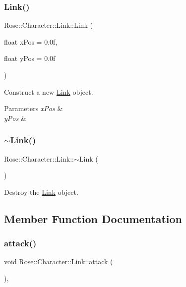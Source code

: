 \subsubsection{\texorpdfstring{Link()}{Link()}}
{\footnotesize\ttfamily Rose\+::\+Character\+::\+Link\+::\+Link (\begin{DoxyParamCaption}\item[{float}]{x\+Pos = {\ttfamily 0.0f},  }\item[{float}]{y\+Pos = {\ttfamily 0.0f} }\end{DoxyParamCaption})}



Construct a new \mbox{\hyperlink{classRose_1_1Character_1_1Link}{Link}} object. 


\begin{DoxyParams}{Parameters}
{\em x\+Pos} & \\
\hline
{\em y\+Pos} & \\
\hline
\end{DoxyParams}
\mbox{\label{classRose_1_1Character_1_1Link_af29f7b4ab9b6a96223fa2364d98bb355}} 
\subsubsection{\texorpdfstring{$\sim$Link()}{~Link()}}
{\footnotesize\ttfamily Rose\+::\+Character\+::\+Link\+::$\sim$\+Link (\begin{DoxyParamCaption}{ }\end{DoxyParamCaption})}



Destroy the \mbox{\hyperlink{classRose_1_1Character_1_1Link}{Link}} object. 



\subsection{Member Function Documentation}
\mbox{\label{classRose_1_1Character_1_1Link_af22163dcc690bbbfdc9425aff8074766}} 
\subsubsection{\texorpdfstring{attack()}{attack()}}
{\footnotesize\ttfamily void Rose\+::\+Character\+::\+Link\+::attack (\begin{DoxyParamCaption}{ }\end{DoxyParamCaption})\hspace{0.3cm}{\ttfamily [override]}, {\ttfamily [virtual]}}



